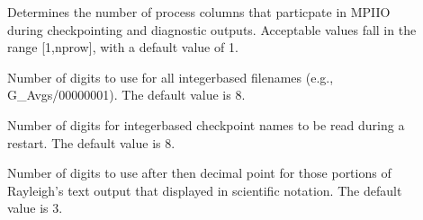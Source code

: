 \documentclass[letterpaper,11pt,english]{sphinxmanual}
\begin{document}
\begin{description}
\item[{}] \leavevmode
\sphinxAtStartPar
Determines the number of process columns that particpate in MPI\sphinxhyphen{}IO during checkpointing and diagnostic outputs.  Acceptable values fall in the range {[}1,nprow{]}, with a default value of 1.

\item[{}] \leavevmode
\sphinxAtStartPar
Number of digits to use for all integer\sphinxhyphen{}based filenames (e.g., G\_Avgs/00000001).  The default value is 8.

\item[{}] \leavevmode
\sphinxAtStartPar
Number of digits for integer\sphinxhyphen{}based checkpoint names to be read during a restart.  The default value is 8.

\item[{}] \leavevmode
\sphinxAtStartPar
Number of digits to use after then decimal point for those portions of Rayleigh’s text output that displayed in scientific notation.  The default value is 3.

\end{description}
\end{document}
